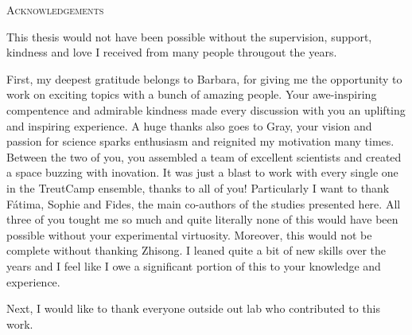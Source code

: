 \begin{center}
    \large\textsc{Acknowledgements}
\end{center}

\noindent
This thesis would not have been possible without the supervision, support, kindness and love I received from many people througout the years. 

First, my deepest gratitude belongs to Barbara, for giving me the opportunity to work on exciting topics with a bunch of amazing people. Your awe-inspiring compentence and admirable kindness made every discussion with you an uplifting and inspiring experience. A huge thanks also goes to Gray, your vision and passion for science sparks enthusiasm and reignited my motivation many times. Between the two of you, you assembled a team of excellent scientists and created a space buzzing with inovation. It was just a blast to work with every single one in the TreutCamp ensemble, thanks to all of you! Particularly I want to thank Fátima, Sophie and Fides, the main co-authors of the studies presented here. All three of you tought me so much and quite literally none of this would have been possible without your experimental virtuosity. Moreover, this would not be complete without thanking Zhisong. I leaned quite a bit of new skills over the years and I feel like I owe a significant portion of this to your knowledge and experience. 




Next, I would like to thank everyone outside out lab who contributed to this work. 


